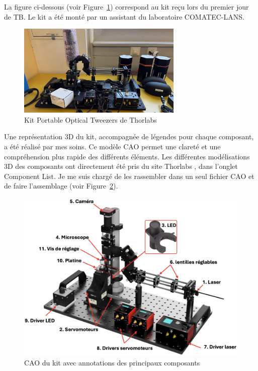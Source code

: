 La figure ci-dessous (voir Figure~\ref{kit_vierge}) correspond au kit reçu lors du premier jour de TB. Le kit a été monté par un assistant du laboratoire COMATEC-LANS.

\begin{figure}[H]
    \begin{center}
        \includegraphics[width=0.7\textwidth]{assets/figures/Introduction/kit_vierge.jpeg}
    \end{center}
    \caption{Kit Portable Optical Tweezers de Thorlabs}
    \label{kit_vierge}
\end{figure}

\newpage
Une représentation 3D du kit, accompagnée de légendes pour chaque composant, a été réalisé par mes soins.\label{modelisation_3D} Ce modèle CAO permet une clareté et une compréhension plus rapide des différents éléments. Les différentes modélisations 3D des composants ont directement été pris du site Thorlabs \cite{portableOpticalTweezers}, dans l'onglet \guillemotleft Component List\guillemetright. Je me suis chargé de les rassembler dans un seul fichier CAO et de faire l'assemblage (voir Figure~\ref{kit_CAO_vierge_annote}).

\begin{figure}[H]
    \begin{center}
        \includegraphics[width=\textwidth]{assets/figures/Introduction/Kit_CAO_vierge_annote.png}
    \end{center}
    \caption{CAO du kit avec annotations des principaux composants}
    \label{kit_CAO_vierge_annote}
\end{figure}

